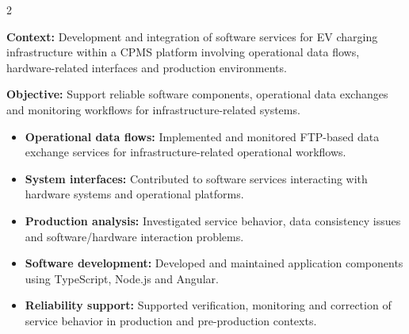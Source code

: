 \documentclass[8pt,a4paper,ragged2e,withhyper]{altacv}
\begin{document}



\makecvheader

\vspace{-0.3cm}


\begin{paracol}{2}



\textbf{Context:} Development and integration of software services for EV charging infrastructure within a CPMS platform involving operational data flows, hardware-related interfaces and production environments.

\textbf{Objective:} Support reliable software components, operational data exchanges and monitoring workflows for infrastructure-related systems.

\begin{itemize}
\item \textbf{Operational data flows:} Implemented and monitored FTP-based data exchange services for infrastructure-related operational workflows.
\item \textbf{System interfaces:} Contributed to software services interacting with hardware systems and operational platforms.
\item \textbf{Production analysis:} Investigated service behavior, data consistency issues and software/hardware interaction problems.
\item \textbf{Software development:} Developed and maintained application components using TypeScript, Node.js and Angular.
\item \textbf{Reliability support:} Supported verification, monitoring and correction of service behavior in production and pre-production contexts.
\end{itemize}


\end{paracol}
\end{document}

